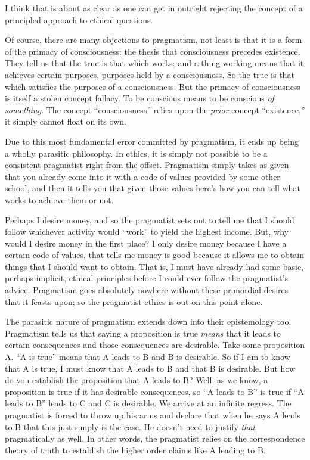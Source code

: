 \documentclass[11pt]{article}
\begin{document}
I think that is about as clear as one can get in outright rejecting the concept of a principled approach to ethical questions.

Of course, there are many objections to pragmatism, not least is that it is a form of the primacy of consciousness: the thesis that consciousness precedes existence. They tell us that the true is that which works; and a thing working means that it achieves certain purposes, purposes held by a consciousness. So the true is that which satisfies the purposes of a consciousness. But the primacy of consciousness is itself a stolen concept fallacy. To be conscious means to be conscious \emph{of something}. The concept ``consciousness'' relies upon the \emph{prior} concept ``existence,'' it simply cannot float on its own.

Due to this most fundamental error committed by pragmatism, it ends up being a wholly parasitic philosophy. In ethics, it is simply not possible to be a consistent pragmatist right from the offset. Pragmatism simply takes as given that you already come into it with a code of values provided by some other school, and then it tells you that given those values here's how you can tell what works to achieve them or not.

Perhaps I desire money, and so the pragmatist sets out to tell me that I should follow whichever activity would ``work'' to yield the highest income. But, why would I desire money in the first place? I only desire money because I have a certain code of values, that tells me money is good because it allows me to obtain things that I should want to obtain. That is, I must have already had some basic, perhaps implicit, ethical principles before I could ever follow the pragmatist's advice. Pragmatism goes absolutely nowhere without these primordial desires that it feasts upon; so the pragmatist ethics is out on this point alone.

The parasitic nature of pragmatism extends down into their epistemology too. Pragmatism tells us that saying a proposition is true \emph{means} that it leads to certain consequences and those consequences are desirable. Take some proposition A. ``A is true'' means that A leads to B and B is desirable. So if I am to know that A is true, I must know that A leads to B and that B is desirable. But how do you establish the proposition that A leads to B? Well, as we know, a proposition is true if it has desirable consequences, so ``A leads to B'' is true if ``A leads to B'' leads to C and C is desirable. We arrive at an infinite regress. The pragmatist is forced to throw up his arms and declare that when he says A leads to B that this just simply is the case. He doesn't need to justify \emph{that} pragmatically as well. In other words, the pragmatist relies on the correspondence theory of truth to establish the higher order claims like A leading to B.
\end{document}
